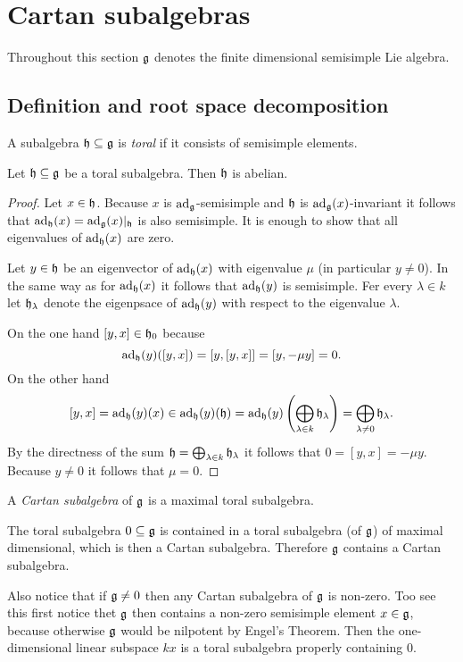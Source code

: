 \section{Cartan subalgebras}
Throughout this section $\mathfrak{g}$ denotes the finite dimensional semisimple Lie algebra.





\subsection{Definition and root space decomposition}


\begin{definition}
 A subalgebra $\mathfrak{h} \subseteq \mathfrak{g}$ is \emph{toral} if it consists of semisimple elements.
\end{definition}


\begin{lemma}
 Let $\mathfrak{h} \subseteq \mathfrak{g}$ be a toral subalgebra. Then $\mathfrak{h}$ is abelian.
\end{lemma}
\begin{proof}
 Let $x \in \mathfrak{h}$. Because $x$ is $\operatorname{ad}_{\mathfrak{g}}$-semisimple and $\mathfrak{h}$ is $\operatorname{ad}_{\mathfrak{g}}(x)$-invariant it follows that $\operatorname{ad}_{\mathfrak{h}}(x) = \operatorname{ad}_{\mathfrak{g}}(x)|_{\mathfrak{h}}$ is also semisimple. It is enough to show that all eigenvalues of $\operatorname{ad}_{\mathfrak{h}}(x)$ are zero.
 
 Let $y \in \mathfrak{h}$ be an eigenvector of $\operatorname{ad}_{\mathfrak{h}}(x)$ with eigenvalue $\mu$ (in particular $y \neq 0$). In the same way as for $\operatorname{ad}_{\mathfrak{h}}(x)$ it follows that $\operatorname{ad}_{\mathfrak{h}}(y)$ is semisimple. Fer every $\lambda \in k$ let $\mathfrak{h}_\lambda$ denote the eigenpsace of $\operatorname{ad}_{\mathfrak{h}}(y)$ with respect to the eigenvalue $\lambda$.
 
  On the one hand $[y,x] \in \mathfrak{h}_0$ because
 \[
  \operatorname{ad}_{\mathfrak{h}}(y)([y,x])
  = [y,[y,x]]
  = [y, -\mu y]
  = 0.
 \]
 On the other hand
 \[
  [y,x]
  = \operatorname{ad}_{\mathfrak{h}}(y)(x)
  \in \operatorname{ad}_{\mathfrak{h}}(y)(\mathfrak{h})
  = \operatorname{ad}_{\mathfrak{h}}(y)\left( \bigoplus_{\lambda \in k} \mathfrak{h}_\lambda \right)
  = \bigoplus_{\lambda \neq 0} \mathfrak{h}_\lambda.
 \]
 By the directness of the sum $\mathfrak{h} = \bigoplus_{\lambda \in k} \mathfrak{h}_\lambda$ it follows that $0 = [y,x] = -\mu y$. Because $y \neq 0$ it follows that $\mu = 0$.
\end{proof}


\begin{definition}
 A \emph{Cartan subalgebra} of $\mathfrak{g}$ is a maximal toral subalgebra.
\end{definition}


\begin{remark}
 The toral subalgebra $0 \subseteq \mathfrak{g}$ is contained in a toral subalgebra (of $\mathfrak{g}$) of maximal dimensional, which is then a Cartan subalgebra. Therefore $\mathfrak{g}$ contains a Cartan subalgebra.
 
 Also notice that if $\mathfrak{g} \neq 0$ then any Cartan subalgebra of $\mathfrak{g}$ is non-zero. Too see this first notice thet $\mathfrak{g}$ then contains a non-zero semisimple element $x \in \mathfrak{g}$, because otherwise $\mathfrak{g}$ would be nilpotent by Engel’s Theorem. Then the one-dimensional linear subspace $kx$ is a toral subalgebra properly containing $0$.
\end{remark}


